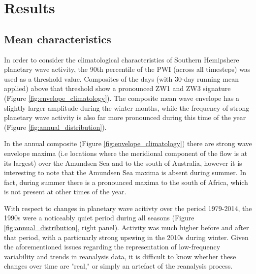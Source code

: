 \section{Results}

\subsection{Mean characteristics}

In order to consider the climatological characteristics of Southern Hemipshere planetary wave activity, the 90th percentile of the PWI (across all timesteps) was used as a threshold value. Composites of the days (with 30-day running mean applied) above that threshold show a pronounced ZW1 and ZW3 signature (Figure \ref{fig:envelope_climatology}). The composite mean wave envelope has a slightly larger amplitude during the winter months, while the frequency of strong planetary wave activity is also far more pronounced during this time of the year (Figure \ref{fig:annual_distribution}).

In the annual composite (Figure \ref{fig:envelope_climatology}) there are strong wave envelope maxima (i.e locations where the meridional component of the flow is at its largest) over the Amundsen Sea and to the south of Australia, however it is interesting to note that the Amundsen Sea maxima is absent during summer. In fact, during summer there is a pronounced maxima to the south of Africa, which is not present at other times of the year.

With respect to changes in planetary wave acitivty over the period 1979-2014, the 1990s were a noticeably quiet period during all seasons (Figure \ref{fig:annual_distribution}, right panel). Activity was much higher before and after that period, with a particuarly strong upswing in the 2010s during winter. Given the aforementioned issues regarding the representation of low-frequency variability and trends in reanalysis data, it is difficult to know whether these changes over time are "real," or simply an artefact of the reanalysis process.
